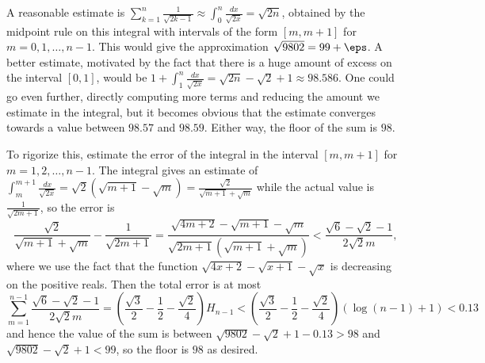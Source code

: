 A reasonable estimate is $\displaystyle\sum_{k=1}^n\frac{1}{\sqrt{2k-1}}\approx\displaystyle\int_0^n\frac{dx}{\sqrt{2x}}=\sqrt{2n}$, obtained by the midpoint rule on this integral with intervals of the form $\left[m,m+1\right]$ for $m=0,1,\ldots,n-1$. This would give the approximation $\sqrt{9802}=99+\eps$. A better estimate, motivated by the fact that there is a huge amount of excess on the interval $\left[0,1\right]$, would be $1+\displaystyle\int_1^n\frac{dx}{\sqrt{2x}}=\sqrt{2n}-\sqrt{2}+1\approx98.586$. One could go even further, directly computing more terms and reducing the amount we estimate in the integral, but it becomes obvious that the estimate converges towards a value between $98.57$ and $98.59$. Either way, the floor of the sum is $\boxed{98}$.

To rigorize this, estimate the error of the integral in the interval $\left[m,m+1\right]$ for $m=1,2,\ldots,n-1$. The integral gives an estimate of $\displaystyle\int_m^{m+1}\frac{dx}{\sqrt{2x}}=\sqrt{2}\left(\sqrt{m+1}-\sqrt{m}\right)=\frac{\sqrt{2}}{\sqrt{m+1}+\sqrt{m}}$ while the actual value is $\frac{1}{\sqrt{2m+1}}$, so the error is \[\frac{\sqrt{2}}{\sqrt{m+1}+\sqrt{m}}-\frac{1}{\sqrt{2m+1}}=\frac{\sqrt{4m+2}-\sqrt{m+1}-\sqrt{m}}{\sqrt{2m+1}\left(\sqrt{m+1}+\sqrt{m}\right)}<\frac{\sqrt{6}-\sqrt{2}-1}{2\sqrt{2}m},\] where we use the fact that the function $\sqrt{4x+2}-\sqrt{x+1}-\sqrt{x}$ is decreasing on the positive reals. Then the total error is at most \[\displaystyle\sum_{m=1}^{n-1}\frac{\sqrt{6}-\sqrt{2}-1}{2\sqrt{2}m}=\left(\frac{\sqrt{3}}{2}-\frac{1}{2}-\frac{\sqrt{2}}{4}\right)H_{n-1}<\left(\frac{\sqrt{3}}{2}-\frac{1}{2}-\frac{\sqrt{2}}{4}\right)\left(\log\left(n-1\right)+1\right)<0.13\] and hence the value of the sum is between $\sqrt{9802}-\sqrt{2}+1-0.13>98$ and $\sqrt{9802}-\sqrt{2}+1<99$, so the floor is $98$ as desired.